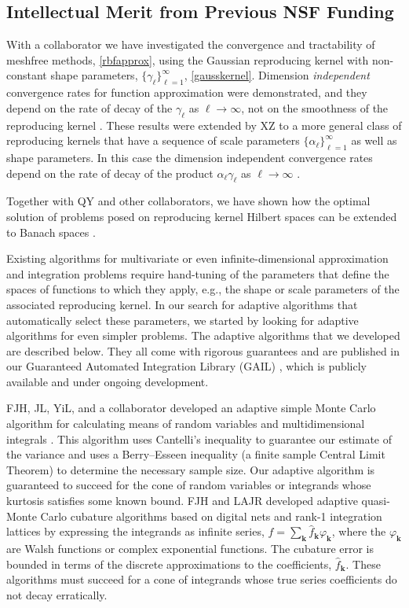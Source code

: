 \documentclass[11pt]{NSFamsart}
\newcommand{\hatf}{\hat{f}}
\newcommand{\bk}{{\boldsymbol{k}}}
\begin{document}
\subsection{Intellectual Merit from Previous NSF Funding}
\label{previousmeritsubsec}

With a collaborator we have investigated the convergence and tractability of meshfree methods, \eqref{rbfapprox}, using the Gaussian reproducing kernel with non-constant shape parameters, $\{\gamma_{\ell}\}_{\ell =1}^{\infty}$, \eqref{gausskernel}. Dimension \emph{independent} convergence rates for function approximation were demonstrated, and they depend on the rate of decay of the $\gamma_{\ell}$ as $\ell \to \infty$, not on the smoothness of the reproducing kernel \citep{FasHicWoz12b, FasHicWoz12a}. These results were extended by XZ to a more general class of reproducing kernels that have a sequence of scale parameters $\{\alpha_{\ell}\}_{\ell=1}^{\infty}$ as well as shape parameters.  In this case the dimension independent convergence rates depend on the rate of decay of the product $\alpha_{\ell} \gamma_{\ell}$ as $\ell \to \infty$ \citep{ZhoHic15a}.

Together with QY and other collaborators, we have shown how the optimal solution of problems posed on reproducing kernel Hilbert spaces can be extended to Banach spaces \citep{SonZhaHic12a, FasHicYe13a}.

Existing algorithms for multivariate or even infinite-dimensional approximation and integration problems require hand-tuning of the parameters that define the spaces of functions to which they apply, e.g., the shape or scale parameters of the associated reproducing kernel.  In our search for adaptive algorithms that automatically select these parameters, we started by looking for adaptive algorithms for even simpler problems. The adaptive algorithms that we developed are described below.  They all come with rigorous guarantees and are published in our Guaranteed Automated Integration Library (GAIL) \citep{ChoEtal14a}, which is publicly available and under ongoing development.

FJH, JL, YiL, and a collaborator developed an adaptive simple Monte Carlo algorithm for calculating means of random variables and multidimensional integrals \citep{HicEtal14a}.  This algorithm uses Cantelli's inequality to guarantee our estimate of the variance and uses a Berry--Esseen inequality (a finite sample Central Limit Theorem) to determine the necessary sample size.  Our adaptive algorithm is guaranteed to succeed for the cone of random variables or integrands whose kurtosis satisfies some known bound.  FJH and LAJR developed adaptive quasi-Monte Carlo cubature algorithms based on digital nets \citep{HicJim16a} and rank-1 integration lattices \citep{JimHic16a} by expressing the integrands as infinite series, $f=\sum_{\bk} \hatf_\bk \varphi_{\bk}$, where the $\varphi_{\bk}$ are Walsh functions or complex exponential functions.  The cubature error is bounded in terms of the discrete  approximations to the coefficients, $\hatf_\bk$.  These algorithms must succeed for a cone of integrands whose true series coefficients do not decay erratically.
\end{document}
